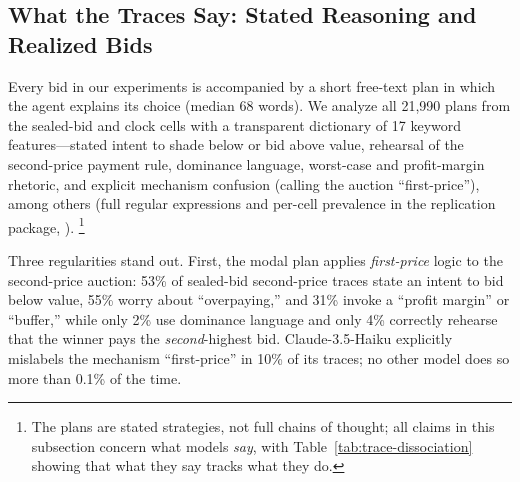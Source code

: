 \subsection{What the Traces Say: Stated Reasoning and Realized Bids}
\label{sec:traces}

Every bid in our experiments is accompanied by a short free-text plan in
which the agent explains its choice (median 68 words). We analyze all
21{,}990 plans from the sealed-bid and clock cells with a transparent
dictionary of 17 keyword features---stated intent to shade below or bid
above value, rehearsal of the second-price payment rule, dominance language,
worst-case and profit-margin rhetoric, and explicit mechanism confusion
(calling the auction ``first-price''), among others (full regular
expressions and per-cell prevalence in the replication package,
).%
\footnote{The plans are stated strategies, not full chains of thought; all
claims in this subsection concern what models \emph{say}, with
Table~\ref{tab:trace-dissociation} showing that what they say tracks what
they do.}

Three regularities stand out. First, the modal plan applies
\emph{first-price} logic to the second-price auction: 53\% of sealed-bid
second-price traces state an intent to bid below value, 55\% worry about
``overpaying,'' and 31\% invoke a ``profit margin'' or ``buffer,'' while
only 2\% use dominance language and only 4\% correctly rehearse that the
winner pays the \emph{second}-highest bid. Claude-3.5-Haiku explicitly
mislabels the mechanism ``first-price'' in 10\% of its traces; no other
model does so more than 0.1\% of the time.

